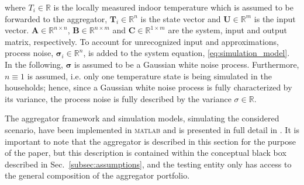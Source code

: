 where $T_i\in\mathbb{R}$ is the locally measured indoor temperature which is assumed to be forwarded to the aggregator, $\boldsymbol{T}_i\in\mathbb{R}^n$ is the state vector and $\boldsymbol{U}\in\mathbb{R}^m$ is the input vector. $\boldsymbol{A}\in\mathbb{R}^{n\times n}$, $\boldsymbol{B}\in\mathbb{R}^{n\times m}$ and $\boldsymbol{C}\in\mathbb{R}^{1\times m}$ are the system, input and output matrix, respectively. To account for unrecognized input and approximations, process noise, $\boldsymbol{\sigma}_i\in\mathbb{R}^n$, is added to the system equation, \eqref{eq:simulation_model}. In the following, $\boldsymbol{\sigma}$ is assumed to be a Gaussian white noise process. Furthermore, $n\equiv1$ is assumed, i.e. only one temperature state is being simulated in the households; hence, since a Gaussian white noise process is fully characterized by its variance, the process noise is fully described by the variance $\sigma\in\mathbb{R}$.%

The aggregator framework and simulation models, simulating the considered scenario, have been implemented in \textsc{matlab} and is presented in full detail in \cite{thavlov2013aggregation}. It is important to note that the aggregator is described in this section for the purpose of the paper, but this description is contained within the conceptual black box described in Sec.~\ref{subsec:assumptions}, and the testing entity only has access to the general composition of the aggregator portfolio.

